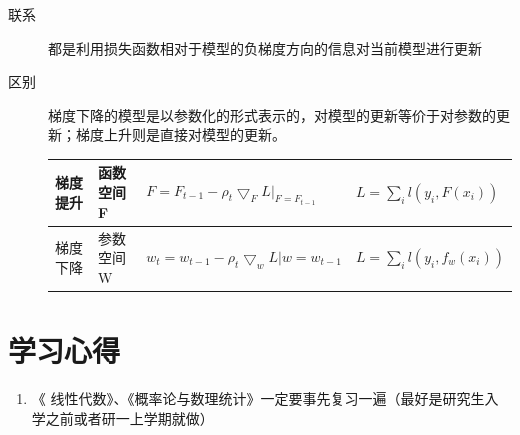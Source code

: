 \documentclass[UTF8]{article}%
\begin{document}
\begin{enumerate}
\begin{description}
				\item[联系] 都是利用损失函数相对于模型的负梯度方向的信息对当前模型进行更新
				\item[区别] 梯度下降的模型是以参数化的形式表示的，对模型的更新等价于对参数的更新；梯度上升则是直接对模型的更新。
			\begin{table}[h]
				\centering
				\begin{tabular}{|l|l|l|l|}
					\hline
					梯度提升 & 函数空间F &  $F=F_{t-1}-\rho_t\bigtriangledown_{F}L|_{F=F_{t-1}}$ & $L=\sum_{i}l(y_i,F(x_i))$ \\ \hline
					梯度下降 & 参数空间W &   $w_t=w_{t-1}-\rho_t\bigtriangledown_wL|{w=w_{t-1}}$ & $L=\sum_{i}l(y_i,f_w(x_i))$     \\ \hline
				\end{tabular}
			\end{table}
			\end{description}
		\end{enumerate}
		\par
		\newpage
		\section{学习心得}
		\begin{enumerate}
			\item《 线性代数》、《概率论与数理统计》一定要事先复习一遍（最好是研究生入学之前或者研一上学期就做）
		\end{enumerate}
\end{document}
